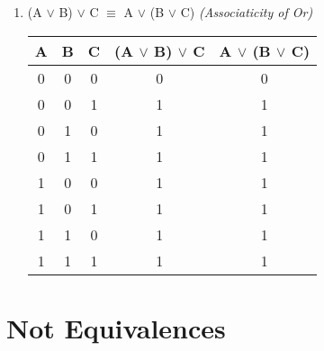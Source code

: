 \documentclass{report}
\begin{document}
\begin{enumerate}
\begin{center}
\end{center}



  \item (A $\lor$ B) $\lor$ C $\equiv$ A $\lor$ (B $\lor$ C) \emph{(Associaticity of Or)}



\begin{center}

  \begin{tabular}{| c | c | c | c | c |}

    \hline

    A & B & C & (A $\lor$ B) $\lor$ C & A $\lor$ (B $\lor$ C) \\ \hline

    0 & 0 & 0 & 0 & 0 \\

    0 & 0 & 1 & 1 & 1 \\

    0 & 1 & 0 & 1 & 1 \\

    0 & 1 & 1 & 1 & 1 \\

    1 & 0 & 0 & 1 & 1 \\

    1 & 0 & 1 & 1 & 1 \\

    1 & 1 & 0 & 1 & 1 \\

    1 & 1 & 1 & 1 & 1 \\ \hline

  \end{tabular}

\end{center}

\end{enumerate}



\section{Not Equivalences}
\end{document}
